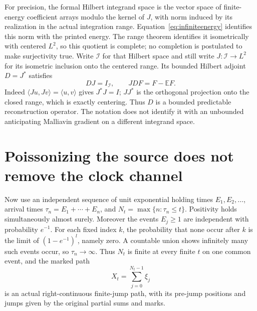 \documentclass[11pt]{article}
\newcommand{\E}{\mathbb E}\newcommand{\Pp}{\mathbb P}
\begin{document}
For precision, the formal Hilbert integrand space is the vector space
of finite-energy coefficient arrays modulo the kernel of $J$, with
norm induced by its realization in the actual integration range.
Equation~\eqref{eq:infiniteenergy} identifies this norm with the printed
energy. The range theorem identifies it isometrically with centered
$L^2$, so this quotient is complete; no completion is postulated to
make surjectivity true. Write $\mathcal I$ for that Hilbert space and
still write $J:\mathcal I\to L^2$ for its isometric inclusion onto the
centered range. Its bounded Hilbert adjoint $D=J^*$ satisfies
\begin{equation}\label{eq:rootadjoint}
 DJ=I_{\mathcal I},\qquad JD F=F-\E F.
\end{equation}
Indeed $\langle Ju,Jv\rangle=\langle u,v\rangle$ gives $J^*J=I$;
$JJ^*$ is the orthogonal projection onto the closed range, which is
exactly centering. Thus $D$ is a bounded predictable reconstruction
operator. The notation does not identify it with an unbounded
anticipating Malliavin gradient on a different integrand space.

\section{Poissonizing the source does not remove the clock channel}
Now use an independent sequence of unit exponential holding times
$E_1,E_2,\ldots$, arrival times $\tau_n=E_1+\cdots+E_n$, and
$N_t=\max\{n:\tau_n\le t\}$. Positivity holds simultaneously almost
surely. Moreover the events $E_j\ge1$ are independent with probability
$e^{-1}$. For each fixed index $k$, the probability that none occur
after $k$ is the limit of $(1-e^{-1})^l$, namely zero. A countable
union shows infinitely many such events occur, so $\tau_n\to\infty$.
Thus $N_t$ is finite at every finite $t$ on one common event, and the
marked path
\[
 X_t=\sum_{j=0}^{N_t-1}\xi_j
\]
is an actual right-continuous finite-jump path, with its pre-jump
positions and jumps given by the original partial sums and marks.
\end{document}
